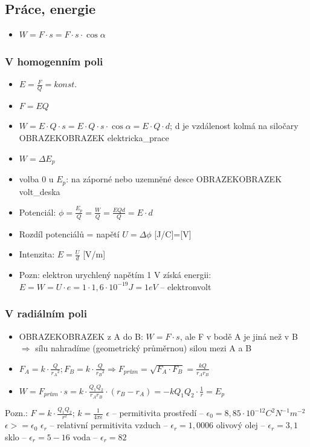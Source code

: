 \documentclass{article}
\begin{document}
\subsection{Práce, energie}
\begin{itemize}
  \item $W = F\cdot s = F\cdot s\cdot \cos \alpha $
\end{itemize}
\subsubsection{V homogenním poli}
\begin{itemize}
  \item $E = \frac{F}{Q} = konst.$
  \item $F = EQ$
  \item $W = E\cdot Q\cdot s = E\cdot Q\cdot s\cdot \cos \alpha = E\cdot Q\cdot d$; d je vzdálenost kolmá na siločary OBRAZEKOBRAZEK elektricka\_prace
  \item $W = \Delta E_p$
  \item volba 0 u $E_p$: na záporné nebo uzemněné desce OBRAZEKOBRAZEK volt\_deska
  \item Potenciál: $\phi = \frac{E_p}{Q} = \frac{W}{Q} = \frac{EQd}{Q} = E\cdot d$
  \item Rozdíl potenciálů = napětí $U = \Delta \phi$ [J/C]=[V]
  \item Intenzita: $E=\frac{U}{d}$ [V/m]
  \item Pozn: elektron urychlený napětím 1 V získá energii: $E = W = U\cdot e = 1\cdot 1,6\cdot 10^{-19}J = 1 eV$ -- elektronvolt
\end{itemize}
\subsubsection{V radiálním poli}
\begin{itemize}
  \item OBRAZEKOBRAZEK z A do B: $W = F \cdot s$, ale F v bodě A je jiná než v B $\Rightarrow$ sílu nahradíme  (geometrický průměrnou) silou mezi A a B
  \item $F_A = k \cdot \frac{Q}{{r_A}^2}; F_B = k \cdot \frac{Q}{{r_B}^2} \Rightarrow F_{prům} = \sqrt{F_A \cdot F_B} = \frac{kQ}{r_A r_B}$
  \item $W = F_{prům}\cdot s = k \cdot \frac{Q_1 Q_2}{r_A r_B}\cdot (r_{B}-r_A) = -kQ_1 Q_2\cdot \frac{1}{r} = E_p$
\end{itemize}
Pozn.: $F = k\cdot\frac{Q_1 Q_2}{r^2}$; $k = \frac{1}{4 \pi \epsilon}$
$\epsilon$ -- permitivita prostředí -- 
$\epsilon_0 = 8,85 \cdot 10^{-12} C^2 N^{-1} m^{-2}$
$\epsilon >= \epsilon_0$
$\epsilon_r$ -- relativní permitivita
vzduch -- $\epsilon_r = 1,0006$
olivový olej -- $\epsilon_r = 3,1$
sklo -- $\epsilon_r = 5-16$
voda -- $\epsilon_r = 82$
\end{document}

